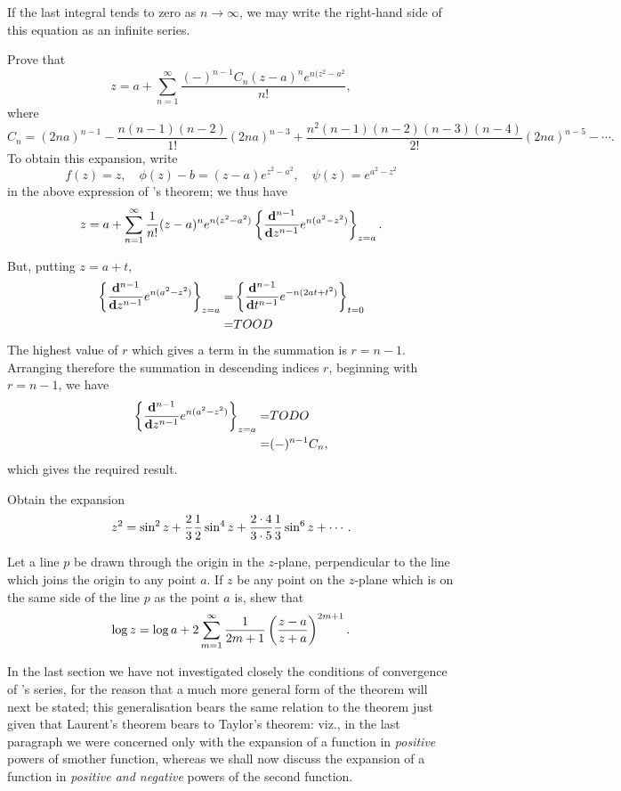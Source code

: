 If the last integral tends to zero as $n \rightarrow \infty$, we may write the
right-hand side of this equation as an infinite series.
\begin{wandwexample}
Prove that
$$
z
=
a
+ \sum_{n=1}^{\infty}
\frac{(-)^{n-1} C_{n} (z-a)^{n} e^{n (z^{2} - a^{2}}}{n!},
$$
where
$$
C_{n}
=
(2na)^{n-1}
- \frac{n(n-1)(n-2)}{1!} (2na)^{n-3}
+ \frac{n^{2}(n-1)(n-2)(n-3)(n-4)}{2!} (2na)^{n-5}
- \cdots.
$$
To obtain this expansion, write
$$
f(z) = z,
\quad
\phi(z) - b = (z-a) e^{z^{2} - a^{2}},
\quad
\psi(z) = e^{a^{2} - z^{2}}
$$
in the above expression
of \Burmann's theorem; we thus have
$$
z
=
a
+ \sum_{n=1}^{\infty}
\frac{1}{n!}
(z-a)^{n}
e^{n(z^{2} - a^{2})}
\left\{ 
  \frac{\mathbf{d}^{n-1}}{\mathbf{d} z^{n-1}}
  e^{n(a^{2} - z^{2})}
 \right\}_{z=a}.
$$

But, putting $z = a + t$,
\begin{align*}
  \left\{ 
    \frac{\mathbf{d}^{n-1}}{\mathbf{d} z^{n-1}}
    e^{n(a^{2} - z^{2})}
   \right\}_{z=a}
  =&
  \left\{ 
    \frac{\mathbf{d}^{n-1}}{\mathbf{d} t^{n-1}}
    e^{-n(2at + t^{2})}
   \right\}_{t=0}
  \\
  =&
  TOOD
\end{align*}
The highest value of $r$ which gives a term in the summation is
$r = n-1$.
Arranging therefore the summation in descending indices $r$,
beginning with $r = n-1$, we have
\begin{align*}
  \left\{ 
    \frac{\mathbf{d}^{n-1}}{\mathbf{d} z^{n-1}}
    e^{n(a^{2} - z^{2})}
   \right\}_{z=a}
  =&
  TODO
  \\
  =& (-)^{n-1} C_{n},
\end{align*}
which gives the required result.
\end{wandwexample}
\begin{wandwexample}
  Obtain the expansion
  $$
  z^{2}
  =
  \sin^{2} z
  + \frac{2}{3} \frac{1}{2} \sin^{4} z
  + \frac{2 \cdot 4}{3 \cdot 5} \frac{1}{3} \sin^{6} z
  + \cdots.
  $$
\end{wandwexample}
%
%
\begin{wandwexample}
Let a line $p$ be drawn through the origin in the $z$-plane,
perpendicular to the line which joins the origin to any point $a$. If
$z$ be any point on the $z$-plane which is on the same side of the line
$p$ as the point $a$ is, shew that
$$
\log z
=
\log a
+ 2 \sum_{m=1}^{\infty}
\frac{1}{2m+1} \left( \frac{z-a}{z+a} \right)^{2m+1}.
$$
\end{wandwexample}

In the last section we have not investigated closely the conditions of
convergence of \Burmann's series, for the reason that a much more
general form of the theorem will next be stated; this generalisation
bears the same relation to the theorem just given that Laurent's
theorem bears to Taylor's theorem: viz., in the last paragraph we
were concerned only with the expansion of a function in \emph{positive}
powers of smother function, whereas we shall now discuss the expansion
of a function in \emph{positive and negative} powers of the second
function.

